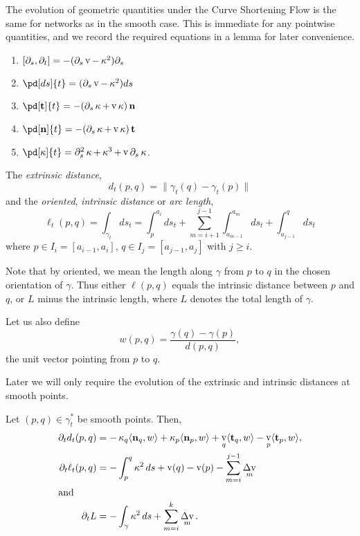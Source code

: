 \documentclass[11pt]{amsart}
\DeclareMathOperator{\tangspeed}{v}
\DeclareMathOperator{\corneranglespeed}{{\Delta v}}
\begin{document}
The evolution of geometric quantities under the Curve Shortening Flow is the same for networks as in the smooth case. This is immediate for any pointwise quantities, and we record the required equations in a lemma for later convenience.

\begin{lemma}
\label{lem:basic_evolution}
\begin{enumerate}
\item \([\partial_s, \partial_t] = -(\partial_s \tangspeed - \curvecurv^2) \partial_s\)
\item \(\pd[ds]{t} = (\partial_s \tangspeed - \curvecurv^2) ds\)
\item \(\pd[\tang]{t} = -(\partial_s \curvecurv + \tangspeed\curvecurv) \nor\)
\item \(\pd[\nor]{t} = -(\partial_s \curvecurv + \tangspeed\curvecurv) \tang\)
\item \(\pd[\curvecurv]{t} = \partial_s^2 \curvecurv + \curvecurv^3 + \tangspeed \partial_s \curvecurv\).
\end{enumerate}
\end{lemma}

The \emph{extrinsic distance},
\[
d_t(p, q) = \|\gamma_t(q) - \gamma_t(p)\|
\]
and the \emph{oriented}, \emph{intrinsic distance} or \emph{arc length},
\[
\ell_t(p, q) = \int_{\gamma_t} ds_t = \int_p^{a_i} ds_t + \sum_{m=i+1}^{j-1} \int_{a_{m-1}}^{a_m} ds_t + \int_{a_{j-1}}^q ds_t
\]
where \(p \in I_i = [a_{i-1}, a_i]\), \(q \in I_j = [a_{j-1}, a_j]\) with \(j\geq i\).

Note that by oriented, we mean the length along \(\gamma\) from \(p\) to \(q\) in the chosen orientation of \(\gamma\). Thus either \(\ell(p,q)\) equals the intrinsic distance between \(p\) and \(q\), or \(L\) minus the intrinsic length, where \(L\) denotes the total length of \(\gamma\).

Let us also define
\[
w(p, q) = \frac{\gamma(q) - \gamma(p)}{d(p,q)},
\]
the unit vector pointing from \(p\) to \(q\).

Later we will only require the evolution of the extrinsic and intrinsic distances at smooth points.

\begin{lemma}
\label{lem:distance_evolution}

Let \((p,q) \in \gamma_t^{\ast}\) be smooth points. Then,
\begin{align*}
\partial_t d_t(p, q) &= -\curvecurv_q \ip{\nor_q}{w} + \curvecurv_p \ip{\nor_p}{w} + \tangspeed_q \ip{\tang_q}{w} - \tangspeed_p \ip{\tang_p}{w}, \\
\partial_t \ell_t(p, q) &= - \int_p^q \curvecurv^2 ds + \tangspeed(q) - \tangspeed(p) - \sum_{m=i}^{j-1} \corneranglespeed_m \\
\intertext{and}
\partial_t L &= - \int_{\gamma} \curvecurv^2 ds + \sum_{m=i}^{k} \corneranglespeed_m.
\end{align*}
\end{lemma}
\end{document}
